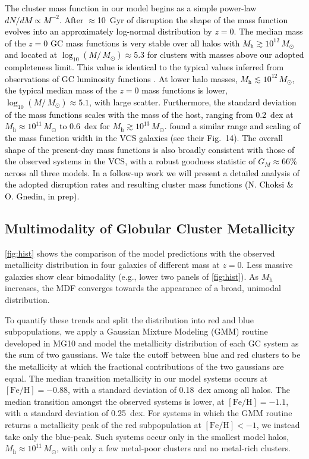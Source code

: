\documentclass[fleqn,usenatbib]{mnras}
\newcommand{\revv}[1]{\textcolor{black}{#1}}
\newcommand{\Mh}{M_{\mathrm{h}}}
\newcommand{\Msun}{\,M_{\odot}}
\newcommand{\feh}{\mathrm{[Fe/H]}}
\begin{document}
\revv{The cluster mass function in our model begins as a simple power-law $dN/dM \propto M^{-2}$. After $\approx$10~Gyr of disruption the shape of the mass function evolves into an approximately log-normal distribution by $z=0$. The median mass of the $z=0$ GC mass functions is very stable over all halos with $\Mh \gtrsim 10^{12} \Msun$ and located at $\log_{10}(M/\Msun) \approx 5.3$ for clusters with masses above our adopted completeness limit. This value is identical to the typical values inferred from observations of GC luminosity functions \citep[e.g.,][]{jordan_etal_2007}. At lower halo masses, $\Mh \lesssim 10^{12} \Msun$, the typical median mass of the $z=0$ mass functions is lower, $\log_{10}(M/\Msun) \approx 5.1$, with large scatter. Furthermore, the standard deviation of the mass functions scales with the mass of the host, ranging from 0.2~dex at $\Mh \approx 10^{11} \Msun$ to 0.6~dex for $\Mh \gtrsim 10^{13} \Msun$. \cite{jordan_etal_2007} found a similar range and scaling of the mass function width in the VCS galaxies (see their Fig.~14). The overall shape of the present-day mass functions is also broadly consistent with those of the observed systems in the VCS, with a robust goodness statistic of $G_M\approx 66\%$ across all three models. In a follow-up work we will present a detailed analysis of the adopted disruption rates and resulting cluster mass functions (N. Choksi \& O. Gnedin, in prep).}

\subsection{Multimodality of Globular Cluster Metallicity}
\label{subsec:multimodality}

\autoref{fig:hist} shows the comparison of the model predictions with the observed metallicity distribution in four galaxies of different mass at $z=0$. Less massive galaxies show clear bimodality (e.g., lower two panels of \autoref{fig:hist}). As $\Mh$ increases, the MDF converges towards the appearance of a broad, unimodal distribution.

To quantify these trends and split the distribution into red and blue subpopulations, we apply a Gaussian Mixture Modeling (GMM) routine developed in MG10 and model the metallicity distribution of each GC system as the sum of two gaussians. We take the cutoff between blue and red clusters to be the metallicity at which the fractional contributions of the two gaussians are equal. The median transition metallicity in our model systems occurs at $\feh = -0.88$, with a standard deviation of 0.18~dex among all halos. The median transition amongst the observed systems is lower, at $\feh = -1.1$, with a standard deviation of 0.25~dex. For systems in which the GMM routine returns a metallicity peak of the red subpopulation at $\feh < -1$, we instead take only the blue-peak. Such systems occur only in the smallest model halos, $\Mh \approx 10^{11} \Msun$, with only a few metal-poor clusters and no metal-rich clusters. 
\end{document}
